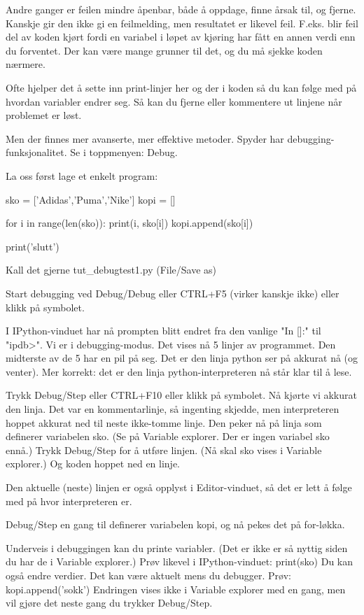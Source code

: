 \documentclass[a4paper,11pt,utf8]{book}
\begin{document}
Andre ganger er feilen mindre åpenbar, både å oppdage, finne årsak til, og fjerne. 
Kanskje gir den ikke gi en feilmelding, men resultatet er likevel feil. 
F.eks. blir feil del av koden kjørt fordi en variabel 
i løpet av kjøring har fått en annen verdi enn du forventet.
Der kan være mange grunner til det, og du må sjekke koden nærmere. 

Ofte hjelper det å sette inn print-linjer her og der i koden så du kan
følge med på hvordan variabler endrer seg. 
Så kan du fjerne eller kommentere ut linjene når problemet er løst.

Men der finnes mer avanserte, mer effektive metoder.  
Spyder har debugging-funksjonalitet.
Se i toppmenyen: Debug.


La oss først lage et enkelt program:

sko = ['Adidas','Puma','Nike']
kopi = []

for i in range(len(sko)): 
    print(i, sko[i])
    kopi.append(sko[i])

print('slutt')

Kall det gjerne tut_debugtest1.py (File/Save as)



Start debugging ved Debug/Debug eller CTRL+F5 (virker kanskje ikke)
eller klikk på symbolet.

I IPython-vinduet har nå prompten blitt endret fra den vanlige "In []:" til "ipdb>".
Vi er i debugging-modus. 
Det vises nå 5 linjer av programmet. Den midterste av de 5 har en pil på seg.
Det er den linja python ser på akkurat nå (og venter).
Mer korrekt: det er den linja python-interpreteren nå står klar til å lese. 

Trykk Debug/Step eller CTRL+F10 eller klikk på symbolet.
Nå kjørte vi akkurat den linja.
Det var en kommentarlinje, så ingenting skjedde, men interpreteren hoppet akkurat
ned til neste ikke-tomme linje.
Den peker nå på linja som definerer variabelen sko.
(Se på Variable explorer. Der er ingen variabel sko ennå.) 
Trykk Debug/Step for å utføre linjen.
(Nå skal sko vises i Variable explorer.)
Og koden hoppet ned en linje.

Den aktuelle (neste) linjen er også opplyst i Editor-vinduet,
så det er lett å følge med på hvor interpreteren er. 

Debug/Step en gang til definerer variabelen kopi,
og nå pekes det på for-løkka.

Underveis i debuggingen kan du printe variabler. 
(Det er ikke er så nyttig siden du har de i Variable explorer.)
Prøv likevel i IPython-vinduet:
print(sko)
Du kan også endre verdier. Det kan være aktuelt mens du debugger. 
Prøv:
kopi.append('sokk')
Endringen vises ikke i Variable explorer med en gang,
men vil gjøre det neste gang du trykker Debug/Step. 
\end{document}
